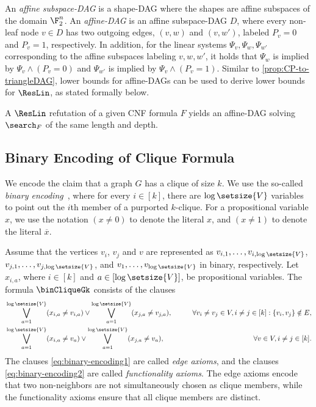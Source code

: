 An \emph{affine subspace-DAG} is a shape-DAG where the shapes are affine subspaces of the domain $\F_2^n$. An \emph{affine-DAG} is an affine subspace-DAG $D$, where  every non-leaf node $v\in D$ has two outgoing edges, $(v,w)$ and $(v,w')$, labeled $P_v=0$ and $P_v=1$, respectively. In addition, for the linear systems $\Psi_v,\Psi_w,\Psi_{w'}$ corresponding to the affine subspaces labeling $v,w,w'$, it holds that $\Psi_w$ is implied by $\Psi_v \land (P_v=0)$ and $\Psi_{w'}$ is implied by $\Psi_v \land (P_v=1)$. 
Similar to \autoref{prop:CP-to-triangleDAG}, lower bounds for affine-DAGs can be used to derive lower bounds for $\ResLin$, as stated formally below.
\begin{proposition}\label{prop:ResLin-to-affineDAG}
    A $\ResLin$ refutation of a given CNF formula $F$ yields an affine-DAG solving $\search_F$ of the same length and depth.
\end{proposition}

\subsection{Binary Encoding of Clique Formula}
\label{sec:bin-encoding}
We encode the claim that a graph $G$ has a clique of size $k$. We use the so-called \emph{binary encoding}~\cite{LPRT17ComplexityRamsey,DGGM24Binary}, where for every $i\in [k]$, there are $\log \setsize{V}$ variables to point out the $i$th member of a purported $k$-clique.
For a propositional variable $x$, we use the notation $(x \neq 0)$ to denote the literal $x$, and $(x \neq 1)$ to denote the literal $\overline{x}$.

Assume that the vertices $v_i$, $v_j$ and $v$ are represented as $v_{i,1}, \dots, v_{i, \log \setsize{V}}$, 
$v_{j,1}, \dots, v_{j, \log \setsize{V}}$, and
$v_{1}, \dots, v_{\log \setsize{V}}$ in binary, respectively.
Let $x_{i,a}$, where $i\in [k]$ and $a \in [\log \setsize{V}]$, be propositional variables. The formula $\binCliqueGk$ consists of the clauses
\begin{align}
    \label{eq:binary-encoding1}
    & \bigvee_{a=1}^{\log \setsize{V}} (x_{i,a}\neq v_{i,a}) \lor  \bigvee_{a=1}^{\log \setsize{V}} (x_{j,a}\neq v_{j,a}), 
    & \qquad \forall v_i\neq v_j\in V, i\neq j \in [k]: \{v_i,v_j\}\notin E, \\
    \label{eq:binary-encoding2}
    & \bigvee_{a=1}^{\log \setsize{V}} (x_{i,a}\neq v_{a}) \lor  \bigvee_{a=1}^{\log \setsize{V}} (x_{j,a}\neq v_{a}), 
    & \qquad \forall v\in V, i\neq j \in [k].
\end{align}
The clauses \eqref{eq:binary-encoding1} are called \emph{edge axioms}, and the clauses \eqref{eq:binary-encoding2} are called \emph{functionality axioms}.
The edge axioms encode that two non-neighbors are not simultaneously chosen as clique members, while the functionality axioms ensure that all clique members are distinct.


